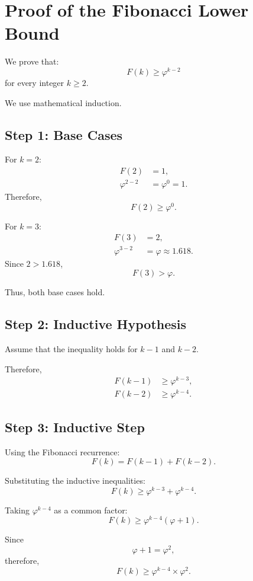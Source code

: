\documentclass[11pt,a4paper]{article}
\begin{document}
\section{Proof of the Fibonacci Lower Bound}

We prove that:
\[
  \boxed{F(k) \ge \varphi^{k-2}}
\]
for every integer $k \ge 2$.

We use mathematical induction.

\subsection*{Step 1: Base Cases}

For $k = 2$:
\begin{align*}
  F(2) &= 1,\\
  \varphi^{2-2} &= \varphi^{0} = 1.
\end{align*}
Therefore,
\[
  F(2) \ge \varphi^{0}.
\]

For $k = 3$:
\begin{align*}
  F(3) &= 2,\\
  \varphi^{3-2} &= \varphi \approx 1.618.
\end{align*}
Since $2 > 1.618$,
\[
  F(3) > \varphi.
\]

Thus, both base cases hold.

\subsection*{Step 2: Inductive Hypothesis}

Assume that the inequality holds for $k-1$ and $k-2$.

Therefore,
\begin{align*}
  F(k-1) &\ge \varphi^{k-3},\\
  F(k-2) &\ge \varphi^{k-4}.
\end{align*}

\subsection*{Step 3: Inductive Step}

Using the Fibonacci recurrence:
\[
  F(k) = F(k-1) + F(k-2).
\]

Substituting the inductive inequalities:
\[
  F(k) \ge \varphi^{k-3} + \varphi^{k-4}.
\]

Taking $\varphi^{k-4}$ as a common factor:
\[
  F(k) \ge \varphi^{k-4}(\varphi + 1).
\]

Since
\[
  \varphi + 1 = \varphi^2,
\]
therefore,
\[
  F(k) \ge \varphi^{k-4} \times \varphi^{2}.
\]
\end{document}
